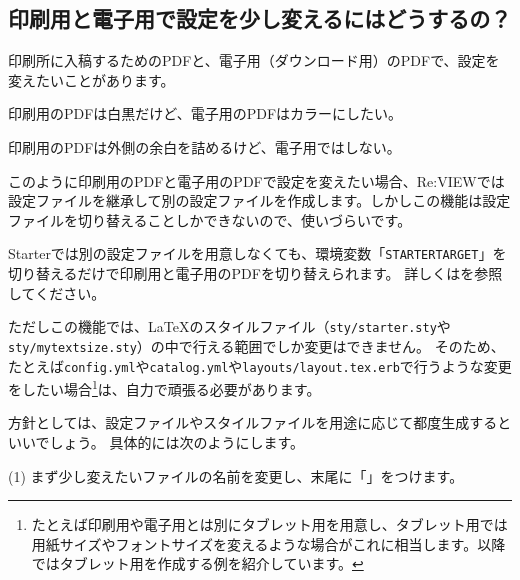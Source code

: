 \subsection{印刷用と電子用で設定を少し変えるにはどうするの？}
\label{sec:2-7-2}
\label{qvtlq}

印刷所に入稿するためのPDFと、電子用（ダウンロード用）のPDFで、設定を変えたいことがあります。

\begin{starteritemize}
\item 印刷用のPDFは白黒だけど、電子用のPDFはカラーにしたい。
\item 印刷用のPDFは外側の余白を詰めるけど、電子用ではしない。
\end{starteritemize}

このように印刷用のPDFと電子用のPDFで設定を変えたい場合、Re:VIEWでは設定ファイルを継承して別の設定ファイルを作成します。しかしこの機能は設定ファイルを切り替えることしかできないので、使いづらいです。

Starterでは別の設定ファイルを用意しなくても、環境変数「\texttt{\textdollar{}STARTER\textunderscore{}TARGET}」を切り替えるだけで印刷用と電子用のPDFを切り替えられます。
詳しくはを参照してください。

\begin{starterterminal}\end{starterterminal}

ただしこの機能では、\LaTeX{}のスタイルファイル（\texttt{sty/starter.sty}や\texttt{sty/mytextsize.sty}）の中で行える範囲でしか変更はできません。
そのため、たとえば\texttt{config.yml}や\texttt{catalog.yml}や\texttt{layouts/layout.tex.erb}で行うような変更をしたい場合\footnote{たとえば印刷用や電子用とは別にタブレット用を用意し、タブレット用では用紙サイズやフォントサイズを変えるような場合がこれに相当します。以降ではタブレット用を作成する例を紹介しています。}は、自力で頑張る必要があります。

方針としては、設定ファイルやスタイルファイルを用途に応じて都度生成するといいでしょう。
具体的には次のようにします。

\vspace*{\baselineskip}
\noindent
(1) まず少し変えたいファイルの名前を変更し、末尾に「」をつけます。

